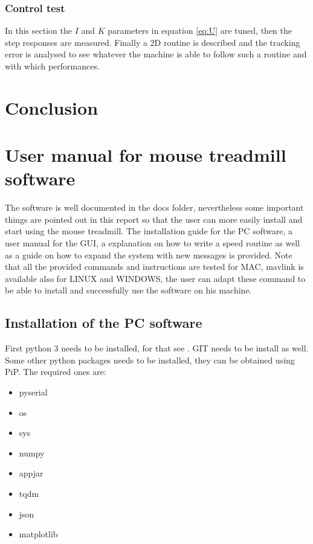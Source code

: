 \documentclass[12pt,a4paper, twoside]{article}
\begin{document}
\subsubsection{Control test}\label{sec:control_test}
In this section the $I$ and $K$ parameters in equation \ref{eq:U} are tuned, then the step responses are measured. Finally a 2D routine is described and the tracking error is analysed to see whatever the machine is able to follow such a routine and with which performances.








\section{Conclusion} \label{sec:conc}

\newpage
\section[User manual]{User manual for mouse treadmill software}
The software is well documented in the docs folder, nevertheless some important things are pointed out in this report so that the user can more easily install and start using the mouse treadmill. The installation guide for the PC software, a user manual for the GUI, a explanation on how to write a speed routine as well as a guide on how to expand the system with new messages is provided. Note that all the provided commands and instructions are tested for MAC, mavlink is available also for LINUX and WINDOWS, the user can adapt these command to be able to install and successfully use the software on his machine. 
\subsection{Installation of the PC software}\label{sec:install}
First python 3 needs to be installed, for that see \cite{py}. GIT needs to be install as well. Some other python packages needs to be installed, they can be obtained using PiP. The required ones are:\\
\begin{multicols}{3}[]
	\begin{itemize}
		\item pyserial
		\item os
		\item sys
		\item numpy
		\item appjar
		\item tqdm
		\item json
		\item matplotlib
	\end{itemize}
\end{multicols}
\end{document}
